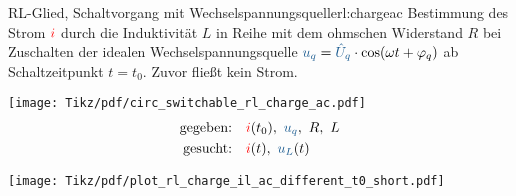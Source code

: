 {    \newpage
    \begin{bsp}{RL-Glied, Schaltvorgang mit Wechselspannungsquelle}{rl:chargeac}
        Bestimmung des Strom ${\color{red}i}$ durch die Induktivität $L$ in Reihe mit dem ohmschen Widerstand $R$ bei Zuschalten der idealen Wechselspannungsquelle
        $\ecv{u_q} = \ecv{\hat{U}_q} \cdot \cos(\omega t + \varphi_q)$ ab Schaltzeitpunkt $t=t_0$. Zuvor fließt kein Strom. \\[-6pt]
        \begin{minipage}{\textwidth}\centering
            \begin{minipage}[t][][t]{0.48\textwidth}\centering\vspace{0cm}%
                \texttt{[image: Tikz/pdf/circ\_switchable\_rl\_charge\_ac.pdf]}%
                \begin{equation*}\begin{aligned}
                \text{gegeben:}&&       &\eci{i}(t_0),\ \ecv{u_q},\ R,\ L \\
                \text{gesucht:}&&       &\eci{i}(t),\ \ecv{u_L}(t)
                \end{aligned}\end{equation*}
            \end{minipage}
            \begin{minipage}[t][][t]{0.48\textwidth}\centering\vspace{0cm}%
                \texttt{[image: Tikz/pdf/plot\_rl\_charge\_il\_ac\_different\_t0\_short.pdf]}
            \end{minipage}
        \end{minipage}


\end{bsp}}
